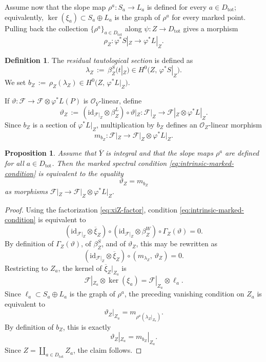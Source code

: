 \documentclass[a4paper,12pt]{amsart}
\numberwithin{equation}{section}
\newtheorem{proposition}[theorem]{Proposition}
\theoremstyle{definition}
\newtheorem{definition}[theorem]{Definition}
\newcommand{\OO}{\mathcal{O}}
\newcommand{\cF}{\mathcal{F}}
\newcommand{\id}{\mathrm{id}}
\begin{document}
Assume now that the slope map
\(
\rho^a:S_a\longrightarrow L_a
\)
is defined for every \(a\in D_{\mathrm{tot}}\); equivalently, \(\ker(\xi_a)\subset S_a\oplus L_a\) is the graph of \(\rho^a\) for every marked point.  Pulling back the collection \(\{\rho^a\}_{a\in D_{\mathrm{tot}}}\) along \(\psi:Z\longrightarrow D_{\mathrm{tot}}\) gives a morphism
\[
\rho_Z:\varphi^*S|_Z\longrightarrow \varphi^*L|_Z.
\]

\begin{definition}\label{def:lambdaZ}
The \emph{residual tautological section} is defined as 
\[
\lambda_Z\,:=\,\beta_Z^S\bigl(t|_Z\bigr)\in H^0\bigl(Z,\,\varphi^*S|_Z\bigr).
\]
We set
\(
b_Z\,:=\,\rho_Z(\lambda_Z)\in H^0\bigl(Z,\,\varphi^*L|_Z\bigr).
\)
\end{definition}

If
\(
\vartheta:\cF\longrightarrow \cF\otimes \varphi^*L(P)
\)
is \(\OO_{\overline{Y}}\)-linear, define
\begin{equation}\label{eq:varthetaZ}
\vartheta_Z\,:=\,(\id_{\cF|_Z}\otimes \beta_Z^L)\circ \vartheta|_Z:
\cF|_Z\longrightarrow \cF|_Z\otimes \varphi^*L|_Z.
\end{equation}
Since \(b_Z\) is a section of \(\varphi^*L|_Z\), multiplication by \(b_Z\) defines an \(\OO_Z\)-linear morphism
\[
m_{b_Z}:\cF|_Z\longrightarrow \cF|_Z\otimes \varphi^*L|_Z.
\]

\begin{proposition}\label{prop:marked-graph}
Assume that \(\overline{Y}\) is integral and that the slope maps \(\rho^a\) are defined for all \(a\in D_{\mathrm{tot}}\).  Then the marked spectral condition \eqref{eq:intrinsic-marked-condition} is equivalent to the equality
\begin{equation}\label{eq:marked-graph-condition}
\vartheta_Z=m_{b_Z}
\end{equation}
as morphisms
\(
\cF|_Z\longrightarrow \cF|_Z\otimes \varphi^*L|_Z.
\)
\end{proposition}
\begin{proof}
Using the factorization \eqref{eq:xiZ-factor}, condition \eqref{eq:intrinsic-marked-condition} is equivalent to
\[
(\id_{\cF|_Z}\otimes \overline{\xi}_Z)\circ
(\id_{\cF|_Z}\otimes \beta_Z^W)\circ \Gamma_Z(\vartheta)=0.
\]
By definition of \(\Gamma_Z(\vartheta)\), of \(\beta_Z^S\), and of \(\vartheta_Z\), this may be rewritten as
\[
(\id_{\cF|_Z}\otimes \overline{\xi}_Z)\circ
(m_{\lambda_Z},\,\vartheta_Z)=0.
\]
Restricting to \(Z_a\), the kernel of \(\overline{\xi}_Z|_{Z_a}\) is
\[
\cF|_{Z_a}\otimes \ker(\xi_a)
=
\cF|_{Z_a}\otimes \ell_a.
\]
Since \(\ell_a\subset S_a\oplus L_a\) is the graph of \(\rho^a\), the preceding vanishing condition on \(Z_a\) is equivalent to
\[
\vartheta_Z|_{Z_a}
=
m_{\rho^a(\lambda_Z|_{Z_a})}.
\]
By definition of \(b_Z\), this is exactly
\[
\vartheta_Z|_{Z_a}=m_{b_Z}|_{Z_a}.
\]
Since \(Z=\coprod_{a\in D_{\mathrm{tot}}} Z_a\), the claim follows.
\end{proof}
\end{document}
